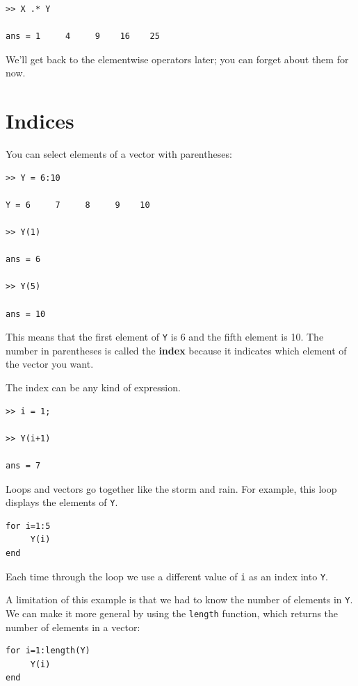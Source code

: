 \documentclass[
]{book}
\begin{document}
\begin{verbatim}
>> X .* Y

ans = 1     4     9    16    25
\end{verbatim}

We'll get back to the elementwise operators later; you can
forget about them for now.




\section{Indices}

You can select elements of a vector with parentheses:

\begin{verbatim}
>> Y = 6:10

Y = 6     7     8     9    10

>> Y(1)

ans = 6

>> Y(5)

ans = 10
\end{verbatim}

This means that the first element of {\tt Y} is 6 and the
fifth element is 10.  The number in parentheses is called
the {\bf index} because it indicates which element of the
vector you want.

The index can be any kind of expression.

\begin{verbatim}
>> i = 1;

>> Y(i+1)

ans = 7
\end{verbatim}

Loops and vectors go together like the storm and rain.
For example, this loop displays the elements of {\tt Y}.

\begin{verbatim}
for i=1:5
     Y(i)
end
\end{verbatim}

Each time through the loop we use a different value of {\tt i}
as an index into {\tt Y}.

A limitation of this example is that we had to know the number
of elements in {\tt Y}.  We can make it more general by using
the {\tt length} function, which returns the number of elements
in a vector:

\begin{verbatim}
for i=1:length(Y)
     Y(i)
end
\end{verbatim}
\end{document}
